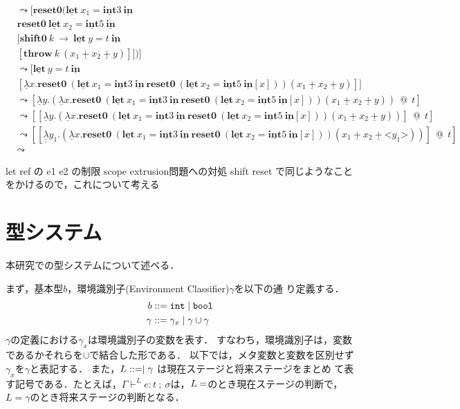 \documentclass[T]{compsoft}
\makeatletter
\newcommand\Resetz{\textbf{reset0}}
\newcommand\Shiftz{\textbf{shift0}}
\newcommand\Throw{\textbf{throw}}
\newcommand\cfun[2]{\underline{\lambda}{#1}.{#2}}
\newcommand\ccfun[2]{\underline{\underline{\lambda}}{#1}.{#2}}
\newcommand\cPlus{\underline{\textbf{+}}}
\newcommand\cLet{\underline{\textbf{let}}}
\newcommand\cIn{\underline{\textbf{in}}}
\newcommand\cint{\underline{\textbf{int}}}
\newcommand\code[1]{\texttt{<}{#1}\texttt{>}}
\newcommand\intT{\mbox{\texttt{int}}}
\newcommand\boolT{\mbox{\texttt{bool}}}
\newcommand\lto{\leadsto}
\newcommand\cat{~\underline{@}~}
\theoremstyle{break}
\makeatother
\begin{document}
\begin{align*}
  [ e_1 ] &\lto [ \Resetz (\cLet~x_1=\cint{3}~\cIn \\
          &\Resetz~ \cLet~x_2=\cint{5}~\cIn \\
          &[ \Shiftz~ k~ \to~ \cLet~ y=t~ \cIn \\
          &[ \Throw~ k~(x_1~\cPlus~x_2~\cPlus~y) ] ] ) ] \\
          &\lto [ \cLet~ y=t~ \cIn \\
          &[ \cfun{x}{\Resetz~ (\cLet~x_1=\cint{3}~ \cIn~ \Resetz~ (\cLet~ x_2=\cint{5}~ \cIn [x]))} (x_1~\cPlus~x_2~\cPlus~y) ]] \\
          &\lto [ \cfun{y}{(\cfun{x}{\Resetz~ (\cLet~x_1=\cint{3}~ \cIn~ \Resetz~ (\cLet~ x_2=\cint{5}~ \cIn [x]))} (x_1~\cPlus~x_2~\cPlus~y))}~ \cat~ t ] \\
          &\lto [[\cfun{y}{(\cfun{x}{\Resetz~ (\cLet~x_1=\cint{3}~ \cIn~ \Resetz~ (\cLet~ x_2=\cint{5}~ \cIn [x]))} (x_1~\cPlus~x_2~\cPlus~y))}]~ \cat~ t] \\
          &\lto [[\ccfun{y_1}{(\cfun{x}{\Resetz~ (\cLet~x_1=\cint{3}~ \cIn~ \Resetz~ (\cLet~ x_2=\cint{5}~ \cIn [x]))} (x_1~\cPlus~x_2~\cPlus~ \code{y_1}))}]~ \cat~ t] \\
          &\lto
\end{align*}

let ref の e1 e2 の制限 scope extrusion問題への対処
shift reset で同じようなことをかけるので，これについて考える


\section{型システム}

本研究での型システムについて述べる．

まず，基本型$b$，環境識別子(Environment Classifier)$\gamma$を以下の通
り定義する．
\begin{align*}
  b & ::= \intT \mid \boolT \\
  \gamma & ::= \gamma_x \mid \gamma \cup \gamma
\end{align*}
$\gamma$の定義における$\gamma_x$は環境識別子の変数を表す．
すなわち，環境識別子は，変数であるかそれらを$\cup$で結合した形である．
以下では，メタ変数と変数を区別せず$\gamma_x$を$\gamma$と表記する．
また，$L ::= \empty \mid \gamma$ は現在ステージと将来ステージをまとめ
て表す記号である．たとえば，$\Gamma \vdash^L
e:t~;~\sigma$は，$L=\empty$のとき現在ステージの判断で，
$L=\gamma$のとき将来ステージの判断となる．
\end{document}
